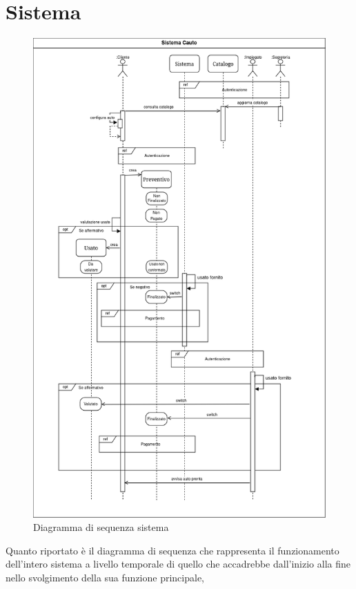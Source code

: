\documentclass[a4paper, 11pt,oneside]{book}
\newcommand{\spacing}{\par\bigskip\noindent}
\begin{document}
    \section{Sistema}
        \begin{figure}[H]
            \centering
            \includegraphics[scale=0.5]{sequence_diagram_sistema.png}
            \caption{Diagramma di sequenza sistema}
            \label{fig:diagramma_sequenza_sistema}
        \end{figure}
        \spacing
        Quanto riportato è il diagramma di sequenza che rappresenta il funzionamento dell'intero sistema a livello temporale di quello che accadrebbe dall'inizio alla fine nello svolgimento della sua funzione principale,
\end{document}
